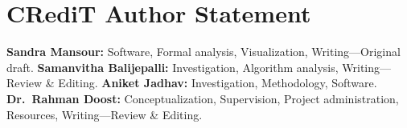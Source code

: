 \documentclass[conference]{IEEEtran}
\begin{document}
\section*{CRediT Author Statement}

\textbf{Sandra Mansour:} Software, Formal analysis, Visualization,
Writing---Original draft. \textbf{Samanvitha Balijepalli:}
Investigation, Algorithm analysis, Writing---Review \& Editing.
\textbf{Aniket Jadhav:} Investigation, Methodology, Software.
\textbf{Dr.\ Rahman Doost:} Conceptualization, Supervision, Project
administration, Resources, Writing---Review \& Editing.



\end{document}
